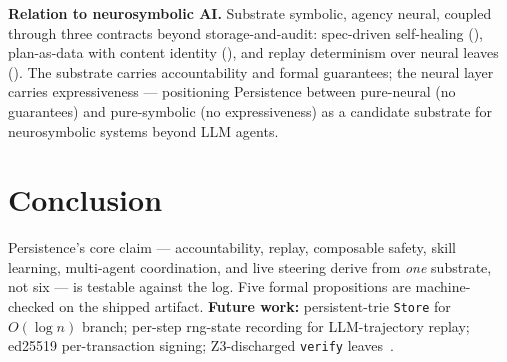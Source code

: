 \documentclass[anon]{nesy2026}   %
\newcommand{\C}[1]{\texttt{#1}}
\begin{document}
\textbf{Relation to neurosymbolic AI.} Substrate symbolic, agency neural, coupled through three contracts beyond storage-and-audit: spec-driven self-healing (), plan-as-data with content identity (), and replay determinism over neural leaves (). The substrate carries accountability and formal guarantees; the neural layer carries expressiveness --- positioning Persistence between pure-neural (no guarantees) and pure-symbolic (no expressiveness) as a candidate substrate for neurosymbolic systems beyond LLM agents.

\section{Conclusion}\label{sec:conclusion}

Persistence's core claim --- accountability, replay, composable safety, skill learning, multi-agent coordination, and live steering derive from \emph{one} substrate, not six --- is testable against the log. Five formal propositions are machine-checked on the shipped artifact. \textbf{Future work:} persistent-trie \C{Store} for $O(\log n)$ branch; per-step rng-state recording for LLM-trajectory replay; ed25519 per-transaction signing; Z3-discharged \C{verify} leaves~\citep{fan2024proofofthought}.

\acks{%
}

\end{document}
